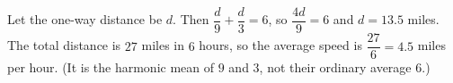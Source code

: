 Let the one-way distance be $d$. Then $\dfrac {d}{9}+\dfrac {d}{3}=6$, so $\dfrac{4d}{9}=6$ and $d=13.5$ miles. The total distance is $27$ miles in $6$ hours, so the average speed is $\dfrac{27}{6}=\boxed{4.5}$ miles per hour. (It is the harmonic mean of $9$ and $3$, not their ordinary average $6$.)
